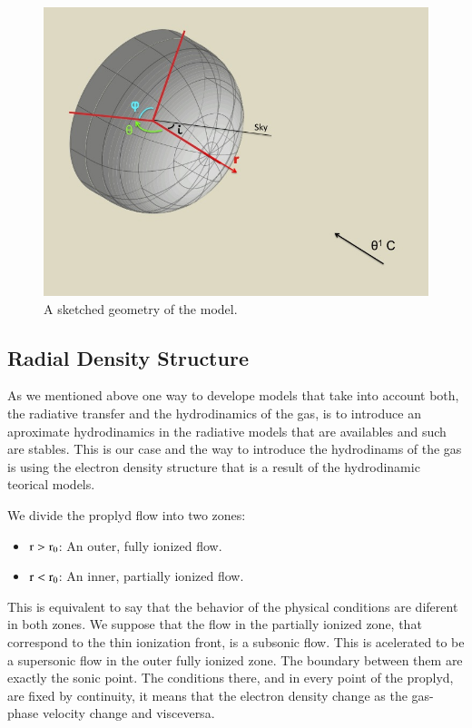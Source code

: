 \documentclass{article}
\begin{document}
\begin{figure}[h]
  \centering
  \includegraphics[width=8.5 cm]{./graf_model_3D/geometry_model.jpg}
  \caption{A sketched geometry of the model.} \label{fig:geometry}
\end{figure}

\subsection{Radial Density Structure}
\label{sec:density}

As we mentioned above one way to develope models that take into account both, the radiative transfer and the hydrodinamics of the gas, is to introduce an aproximate hydrodinamics in the radiative models that are availables and such are stables. This is our case and the way to introduce the hydrodinams of the gas is using the electron density structure that is a result of the hydrodinamic teorical models.

We divide the proplyd flow into two zones:

\begin{itemize}
  \item{$\rm r > r_0$: An outer, fully ionized flow.}
    \item{$\rm r < r_0$: An inner, partially ionized flow.}
\end{itemize}

This is equivalent to say that the behavior of the physical conditions are diferent in both zones. We suppose that the flow in the partially ionized zone, that correspond to the thin ionization front, is a subsonic flow. This is acelerated to be a supersonic flow in the outer fully ionized zone. The boundary between them are exactly the sonic point. The conditions there, and in every point of the proplyd, are fixed by continuity, it means that the electron density change as the gas-phase velocity change and visceversa. 
\end{document}
